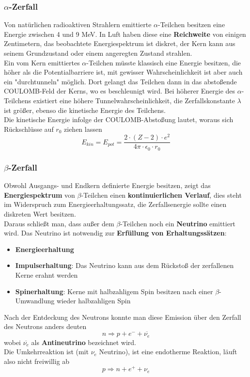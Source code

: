 \documentclass[12pt,a4paper,ngerman]{article}
\begin{document}
\pagebreak

\subsubsection*{$\alpha$-Zerfall}
Von natürlichen radioaktiven Strahlern emittierte $\alpha$-Teilchen besitzen eine Energie zwischen 4 und 9 MeV. In Luft haben diese eine \textbf{Reichweite} von einigen Zentimetern, das beobachtete Energiespektrum ist diskret, der Kern kann aus seinem Grundzustand oder einem angeregten Zustand strahlen. \\
Ein vom Kern emittiertes $\alpha$-Teilchen müsste klassisch eine Energie besitzen, die höher als die Potentialbarriere ist, mit gewisser Wahrscheinlichkeit ist aber auch ein "durchtunneln" möglich. Dort gelangt das Teilchen dann in das abstoßende COULOMB-Feld der Kerns, wo es beschleunigt wird. Bei höherer Energie des $\alpha$-Teilchens existiert eine höhere Tunnelwahrscheinlichkeit, die Zerfallskonstante $\lambda$ ist größer, ebenso die kinetische Energie des Teilchens. \\
Die kinetische Energie infolge der COULOMB-Abstoßung lautet, woraus sich Rückschlüsse auf $r_0$ ziehen lassen
\begin{equation}
E_{kin} = E_{pot} = \frac{2 \cdot (Z-2)\cdot e^2}{4\pi \cdot \epsilon_0 \cdot r_0}
\end{equation}


\subsubsection*{$\beta$-Zerfall}
Obwohl Ausgangs- und Endkern definierte Energie besitzen, zeigt das \textbf{Energiespektrum} von $\beta$-Teilchen einen \textbf{kontinuierlichen Verlauf}, dies steht im Widerspruch zum Energieerhaltungssatz, die Zerfallsenergie sollte einen diskreten Wert besitzen. \\
Daraus schließt man, dass außer dem $\beta$-Teilchen noch ein \textbf{Neutrino} emittiert wird. Das Neutrino ist notwendig zur \textbf{Erfüllung von Erhaltungssätzen}:
\begin{itemize}
\item \textbf{Energieerhaltung}
\item \textbf{Impulserhaltung}: Das Neutrino kann aus dem Rückstoß der zerfallenen Kerne erahnt werden
\item \textbf{Spinerhaltung}: Kerne mit halbzahligem Spin besitzen nach einer $\beta$-Umwandlung wieder halbzahligen Spin
\end{itemize}
Nach der Entdeckung des Neutrons konnte man diese Emission über den Zerfall des Neutrons anders deuten
\begin{equation}
n \Rightarrow p + e^- + \overline{\nu_e}
\end{equation}
wobei $\overline{\nu_e}$ als \textbf{Antineutrino} bezeichnet wird. \\
Die Umkehrreaktion ist (mit $\nu_e$ Neutrino), ist eine endotherme Reaktion, läuft also nicht freiwillig ab
\begin{equation}
p \Rightarrow n + e^+ + \nu_e
\end{equation}
\end{document}
